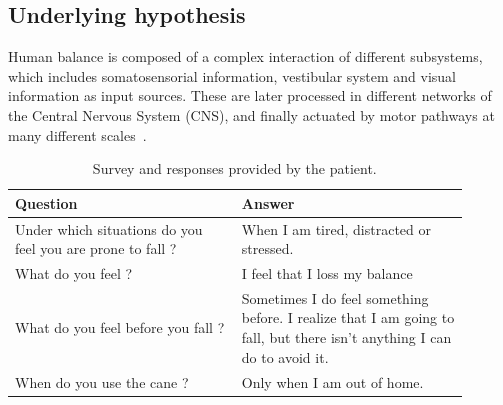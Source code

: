 \documentclass[conference]{IEEEtran}
\begin{document}
\subsection{Underlying hypothesis}
\label{sec:hypothesis}

Human balance is composed of a complex interaction of different subsystems, which includes somatosensorial information, vestibular system and visual information as input sources.  These are later processed in different networks of the Central Nervous System (CNS), and finally actuated by motor pathways at many different scales~\cite{Donato.etal2016}.

\begin{table}[t]
\begin{center}
\begin{tabular}[!t]{|p{0.45\linewidth} |p{0.45\linewidth} |}
\hline
\textbf{Question} & \textbf{Answer} \\
\hline
\hline
Under which situations do you feel you are prone to fall ? & When I am tired, distracted or stressed. \\
\hline
What do you feel ?  & I feel that I loss my balance\\
\hline
What do you feel before you fall ? & Sometimes I do feel something before.  I realize that I am going to fall, but there isn't anything I can do to avoid it. \\
\hline
When do you use the cane ?  & Only when I am out of home.\\
\hline
\end{tabular}
\vspace{10pt}
\caption{Survey and responses provided by the patient.}
\label{tab:patientsurvey}
\end{center}
\end{table}
\end{document}
